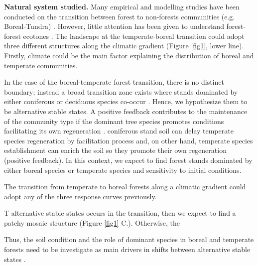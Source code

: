 \textbf{Natural system studied.} Many empirical and modelling studies have
been conducted on the transition between forest to non-forests communities
(e.g. Boreal-Tundra) \cite{Scheffer2012,Scheffer2001,Hirota2011,Messaoud2007}.
However, little attention has been given to understand forest-forest ecotones
\cite{Goldblum2010,Graignic2013,Messaoud2007}.  The landscape at the
temperate-boreal transition could adopt three different structures along the
climatic gradient (Figure \ref{fig1}, lower line). Firstly, climate could be
the main factor explaining the distribution of boreal and temperate
communities.


In the case of the boreal-temperate  forest transition, there is no distinct boundary; instead a broad
transition zone exists where stands dominated by either coniferous or
deciduous species co-occur \cite{Goldblum2010,Fisichelli2013}.  Hence, we
hypothesize them to be alternative stable states. A positive feedback
contributes to the maintenance of the community type if the dominant tree
species promotes conditions facilitating its own regeneration
\cite{Barras1998}.  coniferous stand soil  can delay temperate species
regeneration by facilitation process and, on other hand, temperate species
establishment can enrich the soil so they promote their own regeneration
(positive feedback). In this context, we expect to find forest stands
dominated by either boreal species or temperate species and sensitivity to
initial conditions.

The transition from temperate to boreal forests along a climatic gradient could adopt any of the three response curves previously.


T
 alternative stable states occurs in the
transition, then we expect to find a patchy mosaic structure (Figure
\ref{fig1} C.). Otherwise, the 


Thus, the soil condition and
the role of dominant species in boreal and temperate forests need to be
investigate as main drivers in shifts between alternative stable states
\cite{Kellman2004,Moore2008,DeFrenne2013,Barras1998}.




